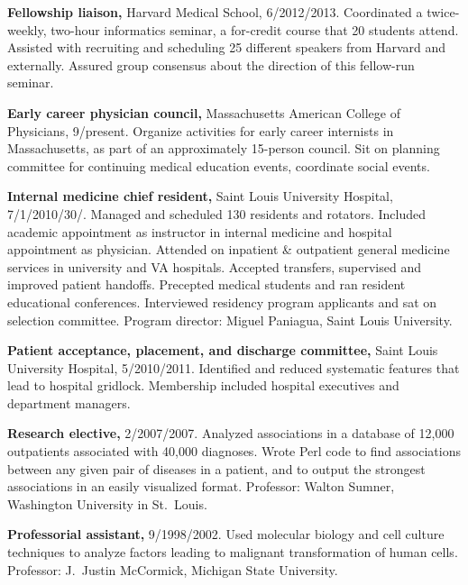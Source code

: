 \documentclass[12pt]{article}
\begin{document}
\textbf{Fellowship liaison,} Harvard Medical School,
6/2012/2013. Coordinated a twice-week\-ly, two-hour informatics
seminar, a for-credit course that 20 students attend. Assisted with
recruiting and scheduling 25 different speakers from Harvard and
externally. Assured group consensus about the direction of this
fellow-run seminar.

\textbf{Early career physician council,} Massachusetts American
College of Physicians,
9/\ndash{}\linebreak[0]pres\-ent. Organize activities
for early career internists in Massachusetts, as part of an
approximately 15-person council. Sit on planning committee for
continuing medical education events, coordinate social events.

\textbf{Internal medicine chief resident,} Saint Louis University
Hospital, 7/1/2010\ndash{}/30/. Managed
and scheduled 130 residents and rotators. Included academic
appointment as instructor in internal medicine and hospital
appointment as physician. Attended on inpatient \& outpatient general
medicine services in university and VA hospitals. Accepted transfers,
supervised and improved patient handoffs. Precepted medical students
and ran resident educational conferences. Interviewed residency
program applicants and sat on selection committee. Program director:
Miguel Paniagua, Saint Louis University.

\textbf{Patient acceptance, placement, and discharge committee,} Saint
Louis University Hospital, 5/2010\ndash{}/2011. Identified
and reduced systematic features that lead to hospital gridlock.
Membership included hospital executives and department managers.

\textbf{Research elective,} 2/2007/2007. Analyzed associations
in a database of 12,000 outpatients associated with 40,000 diagnoses.
Wrote Perl code to find associations between any given pair of
diseases in a patient, and to output the strongest associations in an
easily visualized format. Professor: Walton Sumner, Washington
University in St.\ Louis.

\textbf{Professorial assistant,} 9/1998/2002. Used molecular
biology and cell culture techniques to analyze factors leading to
malignant transformation of human cells. Professor: J.\ Justin
McCormick, Michigan State University.
\end{document}
